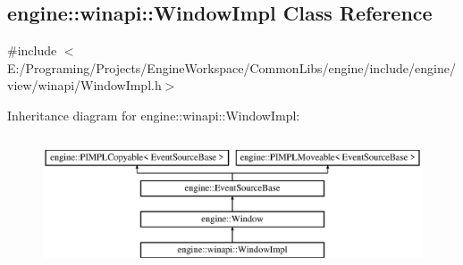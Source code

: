 \hypertarget{a00086}{}\subsection{engine\+:\+:winapi\+:\+:Window\+Impl Class Reference}
\label{a00086}


{\ttfamily \#include $<$E\+:/\+Programing/\+Projects/\+Engine\+Workspace/\+Common\+Libs/engine/include/engine/view/winapi/\+Window\+Impl.\+h$>$}

Inheritance diagram for engine\+:\+:winapi\+:\+:Window\+Impl\+:\begin{figure}[H]
\begin{center}
\leavevmode
\includegraphics[height=3.971631cm]{a00086}
\end{center}
\end{figure}
